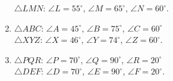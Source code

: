 \begin{enumerate}[label=\color{blue}\arabic*.]
    \(\triangle LMN\): \(\angle L = 55^\circ\), \(\angle M = 65^\circ\), \(\angle N = 60^\circ\).
    \item \(\triangle ABC\): \(\angle A = 45^\circ\), \(\angle B = 75^\circ\), \(\angle C = 60^\circ\) \\
    \(\triangle XYZ\): \(\angle X = 46^\circ\), \(\angle Y = 74^\circ\), \(\angle Z = 60^\circ\).
    \item \(\triangle PQR\): \(\angle P = 70^\circ\), \(\angle Q = 90^\circ\), \(\angle R = 20^\circ\) \\
    \(\triangle DEF\): \(\angle D = 70^\circ\), \(\angle E = 90^\circ\), \(\angle F = 20^\circ\).
\end{enumerate}
